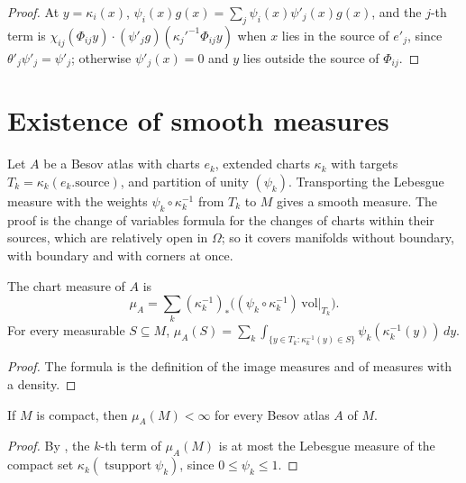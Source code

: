 \begin{proof}
\leanok
At $y = \kappa_i(x)$, $\psi_i(x) g(x) = \sum_j \psi_i(x) \psi'_j(x) g(x)$, and the $j$-th term is
$\chi_{ij}(\Phi_{ij} y) \cdot (\psi'_j g)(\kappa_j'^{-1} \Phi_{ij} y)$ when $x$ lies in the source
of $e'_j$, since $\theta'_j \psi'_j = \psi'_j$; otherwise $\psi'_j(x) = 0$ and $y$ lies outside the
source of $\Phi_{ij}$.
\end{proof}

\section{Existence of smooth measures}
\label{sec:smooth-measure-existence}

Let $A$ be a Besov atlas with charts $e_k$, extended charts $\kappa_k$ with targets
$T_k = \kappa_k(e_k.\mathrm{source})$, and partition of unity $(\psi_k)$. Transporting the
Lebesgue measure with the weights $\psi_k \circ \kappa_k^{-1}$ from $T_k$ to $M$ gives a smooth
measure. The proof is the change of variables formula for the changes of charts within their
sources, which are relatively open in $\Omega$; so it covers manifolds without boundary, with
boundary and with corners at once.

\begin{definition}
\label{def:chart-measure}
\leanok
{}
The chart measure of $A$ is
\[
  \mu_A = \sum_k (\kappa_k^{-1})_* \bigl( (\psi_k \circ \kappa_k^{-1}) \,
    \mathrm{vol}|_{T_k} \bigr) .
\]
For every measurable $S \subseteq M$,
$\mu_A(S) = \sum_k \int_{\{y \in T_k : \kappa_k^{-1}(y) \in S\}} \psi_k(\kappa_k^{-1}(y)) \, dy$.
\end{definition}

\begin{proof}
\leanok
The formula is the definition of the image measures and of measures with a density.
\end{proof}

\begin{lemma}
\label{lem:chart-measure-finite}
\leanok
{}
If $M$ is compact, then $\mu_A(M) < \infty$ for every Besov atlas $A$ of $M$.
\end{lemma}

\begin{proof}
\leanok
By , the $k$-th term of $\mu_A(M)$ is at most the Lebesgue measure of the
compact set $\kappa_k(\operatorname{tsupport} \psi_k)$, since $0 \leq \psi_k \leq 1$.
\end{proof}

